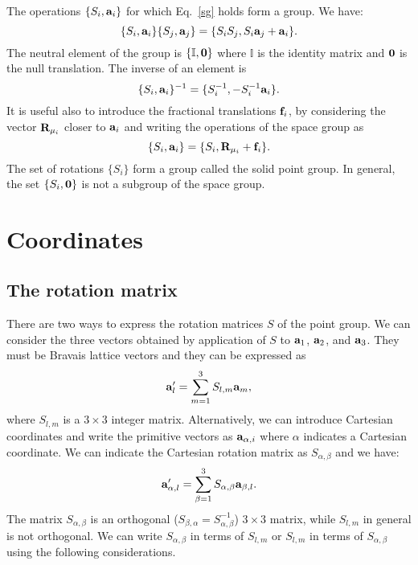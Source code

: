 \documentclass[12pt,a4paper,twoside]{report}
\begin{document}
The operations $\{S_i,{\bf a}_i\}$ for which Eq.~\ref{sg} holds form a group.
We have:
\begin{equation}
\{S_i,{\bf a}_i\} \{S_j,{\bf a}_j\} = \{S_i S_j,S_i {\bf a}_j + {\bf a}_i\}.
\end{equation}
The neutral element of the group is $\{\mathbb{I},{\bf 0}\}$ where
$\mathbb{I}$ is the identity matrix and ${\bf 0}$ is the null translation.
The inverse of an element is
\begin{equation}
\{S_i,{\bf a}_i\}^{-1} = \{S_i^{-1}, -S_i^{-1} {\bf a}_i \}.
\end{equation}
It is useful also to introduce the fractional translations ${\bf f}_i$,
by considering the vector ${\bf R}_{\mu_i}$ closer to ${\bf a}_i$ and
writing the operations of the space group as
\begin{equation}
\{S_i,{\bf a}_i\}= \{S_i,{\bf R}_{\mu_i}+{\bf f}_i\}.
\end{equation}
The set of rotations $\{S_i\}$ form a group called the solid point group. In general, the
set $\{S_i,{\bf 0}\}$ is not a subgroup of the space group.

\section{Coordinates}

\subsection{The rotation matrix}

There are two ways to express the rotation matrices $S$ of the point group. We can consider the three vectors obtained by  application
of $S$ to ${\bf a}_1$, ${\bf a}_2$, and ${\bf a}_3$. They must be Bravais lattice vectors and they can be expressed as
\begin{equation}
{\bf a}'_l = \sum_{m=1}^3 S_{l,m} {\bf a}_m,
\label{scrys}
\end{equation}
where $S_{l,m}$ is a $3\times3$ integer matrix.
Alternatively, we can introduce Cartesian coordinates and write the primitive
vectors as ${\bf a}_{\alpha,i}$ where $\alpha$ indicates a Cartesian coordinate.
We can indicate the Cartesian rotation matrix as $S_{\alpha,\beta}$
and we have:
\begin{equation}
{\bf a}'_{\alpha,l} = \sum_{\beta=1}^3 S_{\alpha,\beta} {\bf a}_{\beta,l}.
\label{scart}
\end{equation}
The matrix $S_{\alpha,\beta}$ is an orthogonal ($S_{\beta,\alpha}=S^{-1}_{\alpha,\beta} $) $3\times 3$ matrix, while 
$S_{l,m}$ in general is not orthogonal. We
can write $S_{\alpha,\beta}$ in terms of $S_{l,m}$ or $S_{l,m}$ in terms
of $S_{\alpha,\beta}$ using the following considerations.
\end{document}
